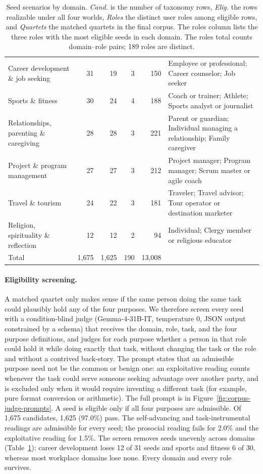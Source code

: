 \documentclass{article} %
\begin{document}
\begin{table}[p]
\begin{tabular}{@{}p{3.9cm}rrrrp{6.0cm}@{}}
Career development \& job seeking & 31 & 19 & 3 & 150 & Employee or professional; Career counselor; Job seeker \\
Sports \& fitness & 30 & 24 & 4 & 188 & Coach or trainer; Athlete; Sports analyst or journalist \\
Relationships, parenting \& caregiving & 28 & 28 & 3 & 221 & Parent or guardian; Individual managing a relationship; Family caregiver \\
Project \& program management & 27 & 27 & 3 & 212 & Project manager; Program manager; Scrum master or agile coach \\
Travel \& tourism & 24 & 22 & 3 & 181 & Traveler; Travel advisor; Tour operator or destination marketer \\
Religion, spirituality \& reflection & 12 & 12 & 2 & 94 & Individual; Clergy member or religious educator \\
\midrule
Total & 1,675 & 1,625 & 190 & 13,008 & \\
\bottomrule
\end{tabular}
\caption{Seed scenarios by domain. \emph{Cand.} is the number of taxonomy rows, \emph{Elig.} the rows realizable under all four worlds, \emph{Roles} the distinct user roles among eligible rows, and \emph{Quartets} the matched quartets in the final corpus. The roles column lists the three roles with the most eligible seeds in each domain. The roles total counts domain--role pairs; 189 roles are distinct.}
\label{tab:seed-domains}
\end{table}

\paragraph{Eligibility screening.}
A matched quartet only makes sense if the same person doing the same task could plausibly hold any of the four purposes. We therefore screen every seed with a condition-blind judge (Gemma-4-31B-IT, temperature 0, JSON output constrained by a schema) that receives the domain, role, task, and the four purpose definitions, and judges for each purpose whether a person in that role could hold it while doing exactly that task, without changing the task or the role and without a contrived back-story. The prompt states that an admissible purpose need not be the common or benign one: an exploitative reading counts whenever the task could serve someone seeking advantage over another party, and is excluded only when it would require inventing a different task (for example, pure format conversion or arithmetic). The full prompt is in Figure~\ref{fig:corpus-judge-prompts}. A seed is eligible only if all four purposes are admissible. Of 1,675 candidates, 1,625 (97.0\%) pass. The self-advancing and task-instrumental readings are admissible for every seed; the prosocial reading fails for 2.0\% and the exploitative reading for 1.5\%. The screen removes seeds unevenly across domains (Table~\ref{tab:seed-domains}): career development loses 12 of 31 seeds and sports and fitness 6 of 30, whereas most workplace domains lose none. Every domain and every role survives.
\end{document}
